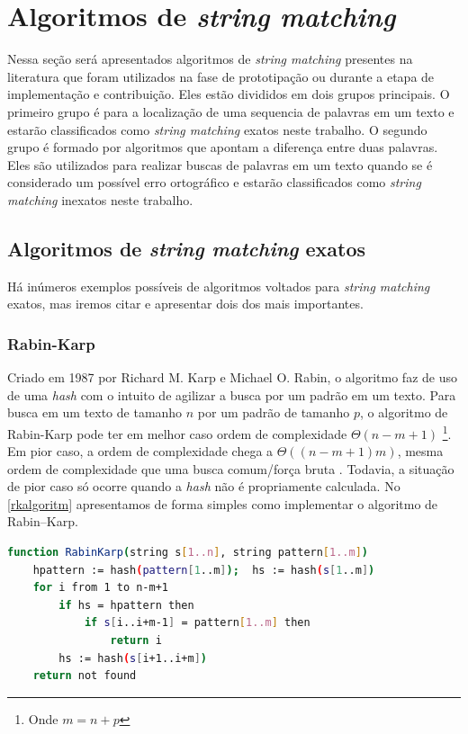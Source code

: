 \section{\nmu Algoritmos de  \textit{string matching}} %
\label{sec:algoritimos_de_textit}


Nessa seção será apresentados algoritmos de \textit{string matching} presentes na literatura que foram utilizados na fase de prototipação ou durante a etapa de implementação e contribuição. Eles estão divididos em dois grupos principais. O primeiro grupo é para a localização de uma sequencia de palavras em um texto e estarão classificados como \textit{string matching} exatos neste trabalho. O segundo grupo é formado por algoritmos que apontam a diferença entre duas palavras. Eles são utilizados para realizar buscas de palavras em um texto quando se é considerado um possível erro ortográfico e estarão classificados como \textit{string matching} inexatos neste trabalho.

\subsection{\nmu Algoritmos de \textit{string matching} exatos} %
\label{sub:algoritimos_de_textit}

Há inúmeros exemplos possíveis de algoritmos voltados para \textit{string matching} exatos, mas iremos citar e apresentar dois dos mais importantes.

\subsubsection*{Rabin-Karp} %
\label{ssub:rabin_karp}

Criado  em 1987  por  Richard M. Karp e Michael O. Rabin, o algoritmo faz de uso de uma \textit{hash} com o intuito de agilizar a busca por um padrão em um texto. Para busca em um texto de tamanho $n$ por um padrão de tamanho $p$, o algoritmo de Rabin-Karp pode ter em melhor caso ordem de complexidade $\Theta(n-m+1)$ \cite{paulo2015algoritmos}\footnote{Onde $m=n+p$}. Em pior caso, a ordem de complexidade chega a $\Theta((n-m+1)m)$, mesma ordem de complexidade que uma busca comum/força bruta \cite{paulo2015algoritmos}. Todavia, a situação de pior caso só ocorre quando a \textit{hash} não é propriamente calculada. No \autoref{rkalgoritm} apresentamos de forma simples como implementar o algoritmo de Rabin–Karp.

\begin{lstlisting}[language=Bash,label=rkalgoritm,caption={Algoritmo de Rabin–Karp}]
function RabinKarp(string s[1..n], string pattern[1..m])
	hpattern := hash(pattern[1..m]);  hs := hash(s[1..m])
	for i from 1 to n-m+1
		if hs = hpattern then
			if s[i..i+m-1] = pattern[1..m] then
				return i
		hs := hash(s[i+1..i+m])
	return not found
\end{lstlisting}

